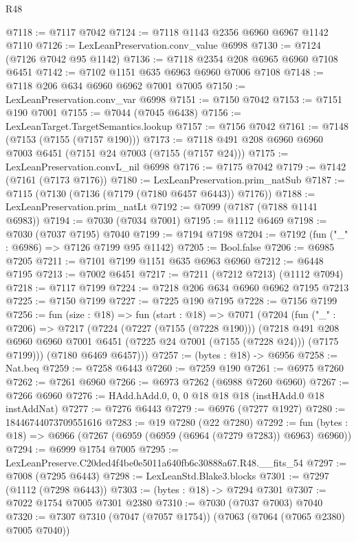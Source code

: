 \begin{lexlean}{R48}
\begin{coremodule}
@7118 := @7117 @7042
@7124 := @7118 @1143 @2356 @6960 @6967 @1142 @7110
@7126 := LexLeanPreservation.conv_value @6998
@7130 := @7124 (@7126 @7042 @95 @1142)
@7136 := @7118 @2354 @208 @6965 @6960 @7108 @6451
@7142 := @7102 @1151 @635 @6963 @6960 @7006 @7108
@7148 := @7118 @206 @634 @6960 @6962 @7001 @7005
@7150 := LexLeanPreservation.conv_var @6998
@7151 := @7150 @7042
@7153 := @7151 @190 @7001
@7155 := @7044 (@7045 @6438)
@7156 := LexLeanTarget.TargetSemantics.lookup
@7157 := @7156 @7042
@7161 := @7148 (@7153 (@7155 (@7157 @190)))
@7173 := @7118 @491 @208 @6960 @6960 @7003 @6451 (@7151 @24 @7003 (@7155 (@7157 @24)))
@7175 := LexLeanPreservation.convL_nil @6998
@7176 := @7175 @7042
@7179 := @7142 (@7161 (@7173 @7176))
@7180 := LexLeanPreservation.prim_natSub
@7187 := @7115 (@7130 (@7136 (@7179 (@7180 @6457 @6443)) @7176))
@7188 := LexLeanPreservation.prim_natLt
@7192 := @7099 (@7187 (@7188 @1141 @6983))
@7194 := @7030 (@7034 @7001)
@7195 := @1112 @6469
@7198 := @7030 (@7037 @7195) @7040
@7199 := @7194 @7198
@7204 := @7192 (fun ("_" : @6986) => @7126 @7199 @95 @1142)
@7205 := Bool.false
@7206 := @6985 @7205
@7211 := @7101 @7199 @1151 @635 @6963 @6960
@7212 := @6448 @7195
@7213 := @7002 @6451
@7217 := @7211 (@7212 @7213) (@1112 @7094)
@7218 := @7117 @7199
@7224 := @7218 @206 @634 @6960 @6962 @7195 @7213
@7225 := @7150 @7199
@7227 := @7225 @190 @7195
@7228 := @7156 @7199
@7256 := fun (size : @18) =>
  fun (start : @18) =>
  @7071
    (@7204
      (fun ("_" : @7206) =>
      @7217
        (@7224
          (@7227 (@7155 (@7228 @190)))
          (@7218
            @491
            @208
            @6960
            @6960
            @7001
            @6451
            (@7225 @24 @7001 (@7155 (@7228 @24)))
            (@7175 @7199)))
        (@7180 @6469 @6457)))
@7257 := (bytes : @18) -> @6956
@7258 := Nat.beq
@7259 := @7258 @6443
@7260 := @7259 @190
@7261 := @6975 @7260
@7262 := @7261 @6960
@7266 := @6973 @7262 (@6988 @7260 @6960)
@7267 := @7266 @6960
@7276 := HAdd.hAdd.{0, 0, 0} @18 @18 @18 (instHAdd.{0} @18 instAddNat)
@7277 := @7276 @6443
@7279 := @6976 (@7277 @1927)
@7280 := 18446744073709551616
@7283 := @19 @7280 (@22 @7280)
@7292 := fun (bytes : @18) => @6966 (@7267 (@6959 (@6959 (@6964 (@7279 @7283)) @6963) @6960))
@7294 := @6999 @1754 @7005
@7295 := LexLeanPreserve.C20ded4f4be0e5011a640fb6c30888a67.R48.__fits_54
@7297 := @7008 (@7295 @6443)
@7298 := LexLeanStd.Blake3.blocks
@7301 := @7297 (@1112 (@7298 @6443))
@7303 := (bytes : @18) -> @7294 @7301
@7307 := @7022 @1754 @7005 @7301 @2380
@7310 := @7030 (@7037 @7003) @7040
@7320 := @7307 @7310 (@7047 (@7057 @1754)) (@7063 (@7064 (@7065 @2380) @7005 @7040))

\end{coremodule}
\end{lexlean}
